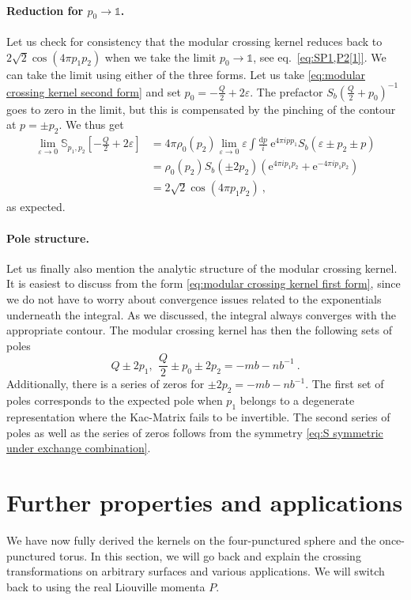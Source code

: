 \documentclass[12pt,a4paper]{article}
\newcommand{\be}{\begin{equation}}
\newcommand{\ee}{\end{equation}}
\renewcommand\d{\text{d}}
\newcommand\id{\mathds{1}}
\begin{document}
\paragraph{Reduction for $p_0 \to \id$.} Let us check for consistency that the modular crossing kernel reduces back to $2 \sqrt{2} \cos(4\pi p_1 p_2)$ when we take the limit $p_0 \to \id$, see eq.~\eqref{eq:SP1,P2[1]}. We can take the limit using either of the three forms. Let us take \eqref{eq:modular crossing kernel second form} and set $p_0=-\frac{Q}{2}+2 \varepsilon$. The prefactor $S_b(\frac{Q}{2}+p_0)^{-1}$ goes to zero in the limit, but this is compensated by the pinching of the contour at $p=\pm p_2$. We thus get
\begin{align}
    \lim_{\varepsilon \to 0} \mathbb{S}_{p_1,p_2}[-\tfrac{Q}{2}+2 \varepsilon]&=4\pi \rho_0(p_2) \lim_{\varepsilon \to 0} \varepsilon\int \frac{\d p}{i} \ \mathrm{e}^{4\pi i p p_1} S_b(\varepsilon  \pm p_2 \pm p) \\
    &=\rho_0(p_2) S_b(\pm 2p_2) (\mathrm{e}^{4\pi i p_1 p_2}+\mathrm{e}^{-4\pi i p_1 p_2}) \\
    &=2 \sqrt{2} \cos(4\pi p_1p_2)\ ,
\end{align}
as expected.

\paragraph{Pole structure.} Let us finally also mention the analytic structure of the modular crossing kernel. It is easiest to discuss from the form \eqref{eq:modular crossing kernel first form}, since we do not have to worry about convergence issues related to the exponentials underneath the integral. As we discussed, the integral always converges with the appropriate contour.
The modular crossing kernel has then the following sets of poles
\be 
Q \pm 2p_1,\, \ \frac{Q}{2} \pm p_0 \pm 2p_2 = -m b-n b^{-1}\ .
\ee
Additionally, there is a series of zeros for $ \pm 2p_2=-m b-n b^{-1}$.
The first set of poles corresponds to the expected pole when $p_1$ belongs to a degenerate representation where the Kac-Matrix fails to be invertible. The second series of poles as well as the series of zeros follows from the symmetry \eqref{eq:S symmetric under exchange combination}.

\section{Further properties and applications} \label{sec:further properties and applications}
We have now fully derived the kernels on the four-punctured sphere and the once-punctured torus. In this section, we will go back and explain the crossing transformations on arbitrary surfaces and various applications. We will switch back to using the real Liouville momenta $P$.
\end{document}
